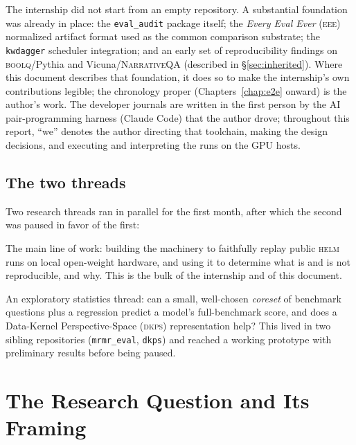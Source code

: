 \documentclass[11pt]{report}
\newcommand{\eeeshort}{\textsc{eee}\xspace}
\newcommand{\code}[1]{\texttt{#1}}
\newcommand{\file}[1]{\texttt{#1}}
\begin{document}
The internship did not start from an empty repository. A substantial foundation
was already in place: the \file{eval\_audit} package itself; the \emph{Every Eval
Ever} (\eeeshort) normalized artifact format used as the common comparison
substrate; the \code{kwdagger} scheduler integration; and an early set of
reproducibility findings on \textsc{boolq}/Pythia and Vicuna/\textsc{NarrativeQA}
(described in \S\ref{sec:inherited}). Where this document describes that
foundation, it does so to make the internship's own contributions legible; the
chronology proper (Chapters~\ref{chap:e2e} onward) is the author's work. The
developer journals are written in the first person by the AI pair-programming
harness (Claude Code) that the author drove; throughout this report, ``we'' denotes
the author directing that toolchain, making the design decisions, and executing and
interpreting the runs on the GPU hosts.

\section{The two threads}

Two research threads ran in parallel for the first month, after which the second
was paused in favor of the first:

\begin{description}[style=nextline,leftmargin=1.5em]
  \item[Thread A --- \textsc{helm} reproduction (Chapters \ref{chap:framing}--\ref{chap:reporting}).]
    The main line of work: building the machinery to faithfully replay public
    \textsc{helm} runs on local open-weight hardware, and using it to determine
    what is and is not reproducible, and why. This is the bulk of the internship
    and of this document.
  \item[Thread B --- efficient benchmarking (Chapter \ref{chap:effbench}).]
    An exploratory statistics thread: can a small, well-chosen \emph{coreset} of
    benchmark questions plus a regression predict a model's full-benchmark score,
    and does a Data-Kernel Perspective-Space (\textsc{dkps}) representation help?
    This lived in two sibling repositories (\file{mrmr\_eval}, \file{dkps}) and
    reached a working prototype with preliminary results before being paused.
\end{description}

\chapter{The Research Question and Its Framing}
\label{chap:framing}
\end{document}
